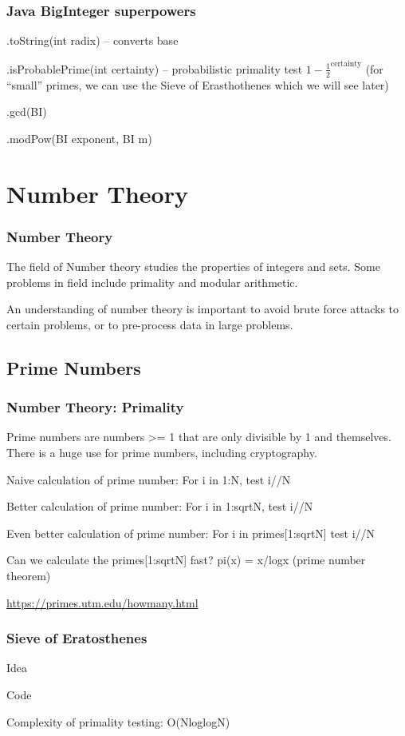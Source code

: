\documentclass{beamer}
\begin{document}
\begin{frame}
  \frametitle{Java BigInteger superpowers}

  .toString(int radix) -- converts base

  .isProbablePrime(int certainty) -- probabilistic primality test
  $1-\frac{1}{2}^{\text{certainty}}$ (for ``small'' primes, we can use
  the Sieve of Erasthothenes which we will see later)

  .gcd(BI)

  .modPow(BI exponent, BI m)  
\end{frame}



\section{Number Theory}
\begin{frame}
  \frametitle{Number Theory} 
  The field of Number theory studies the properties of integers and
  sets. Some problems in field include primality and modular arithmetic.

  An understanding of number theory is important to avoid brute 
  force attacks to certain problems, or to pre-process data in large
  problems.
\end{frame}

\subsection{Prime Numbers}
\begin{frame}
  \frametitle{Number Theory: Primality} 
  
  Prime numbers are numbers >= 1 that are only divisible by 1 and
  themselves. There is a huge use for prime numbers, including 
  cryptography.

  Naive calculation of prime number: For i in 1:N, test i//N

  Better calculation of prime number: For i in 1:sqrtN, test i//N

  Even better calculation of prime number: For i in primes[1:sqrtN] test i//N

  Can we calculate the primes[1:sqrtN] fast? pi(x) = x/logx (prime number theorem)

  \hfill {\tiny \url{https://primes.utm.edu/howmany.html}}
\end{frame}


\begin{frame}
  \frametitle{Sieve of Eratosthenes}

  Idea

  Code
  
  Complexity of primality testing: O(NloglogN)
\end{frame}
\end{document}
